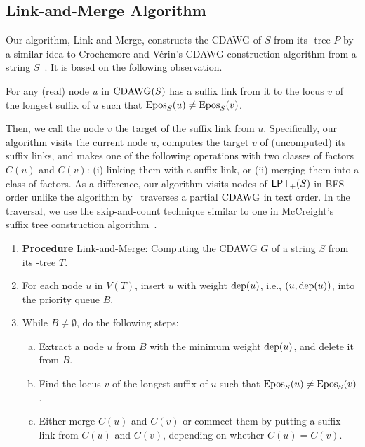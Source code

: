 \subsection{Link-and-Merge Algorithm}
\label{sec:algo:link:merge}

Our algorithm, \textsf{Link-and-Merge}, constructs the CDAWG of $S$ from its \LPTrm-tree $P$
by a similar idea to Crochemore and V\'erin's CDAWG construction algorithm from a string $S$~\cite{crochemore:verin1997direct}. 
It is based on the following observation. 

\begin{lemma}
For any (real) node $u$ in $\mathrm{CDAWG}(S)$ has a suffix link from it to the locus $v$ of the longest suffix  of $u$ such that $\mathrm{Epos}_{S}(u) \not= \mathrm{Epos}_{S}(v)$.
\end{lemma}

Then, we call the node $v$ the target of the suffix link from $u$. 
Specifically, our algorithm visits the current node $u$, computes the target $v$ of (uncomputed) its suffix links, and makes one of the following operations with two classes of factors $C(u)$ and $C(v)$: (i) linking them with a suffix link, or (ii) merging them into a class of factors.
As a difference, our algorithm visits nodes of $\mathsf{LPT}_{+}(S)$ in BFS-order unlike the algorithm by~\cite{crochemore:verin1997direct} traverses a partial $\mathrm{CDAWG}$ in text order. In the traversal, we use the skip-and-count technique similar to one in McCreight's suffix tree construction algorithm~\cite{mccreight1976space}.

\begin{definition}\label{lem:maxrep:algo:highlevel}
\begin{enumerate}[(1)]
\item[] \hspace{-.75\leftmargini}\textbf{Procedure} Link-and-Merge: Computing the CDAWG $G$ of a string $S$ from its \LPTrm-tree $T$.
\item For each node $u$ in $V(T)$, insert $u$ with weight $\mathrm{dep}(u)$, i.e., $(u, \mathrm{dep}(u))$, into the priority queue $B$.
\item While $B \not= \emptyset$, do the following steps: 
\begin{enumerate}[(a)]
\item Extract a node $u$ from $B$ with the minimum weight $\mathrm{dep}(u)$, and delete it from $B$. 
\item Find the locus $v$ of the longest suffix  of $u$ such that $\mathrm{Epos}_{S}(u) \not= \mathrm{Epos}_{S}(v)$.
\item Either merge $C(u)$ and $C(v)$ or commect them by putting a suffix link from  $C(u)$ and $C(v)$, depending on whether $C(u) = C(v)$. 
\end{enumerate}
\end{enumerate}
\end{definition}

